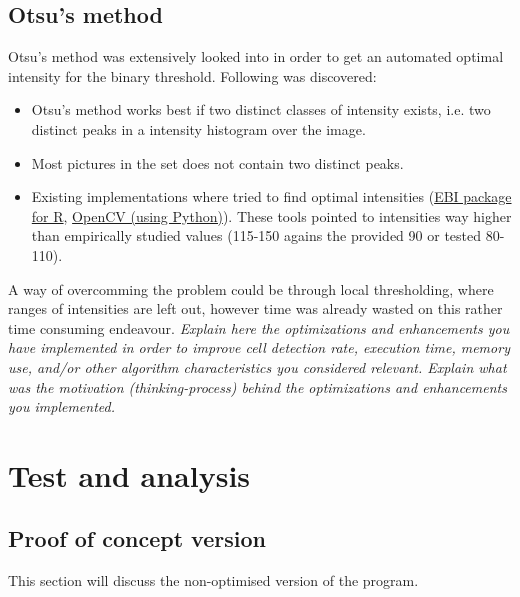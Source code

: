 \documentclass[a4paper, english]{article}
\numberwithin{equation}{section}
\begin{document}
\subsection{Otsu's method}
Otsu's method was extensively looked into in order to get an automated optimal intensity for the binary threshold. Following was discovered:
\begin{itemize}
    \item Otsu's method works best if two distinct classes of intensity exists, i.e. two distinct peaks in a intensity histogram over the image.
    \item Most pictures in the set does not contain two distinct peaks.
    \item Existing implementations where tried to find optimal intensities (\href{https://rdrr.io/bioc/EBImage/}{EBI package for R}, \href{https://opencv.org/}{OpenCV (using Python)}). These tools pointed to intensities way higher than empirically studied values (115-150 agains the provided 90 or tested 80-110).
\end{itemize}
A way of overcomming the problem could be through local thresholding, where ranges of intensities are left out, however time was already wasted on this rather time consuming endeavour.\newline
\textit{Explain here the optimizations and enhancements you have implemented in order to improve cell detection rate, execution time, memory use, and/or other algorithm characteristics you considered relevant. Explain what was the motivation (thinking-process) behind the optimizations and enhancements you implemented.}
\section{Test and analysis}
\subsection{Proof of concept version}\label{sec:poctest}
This section will discuss the non-optimised version of the program.
\end{document}

